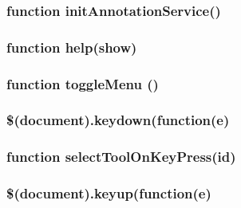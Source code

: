 \subsubsection{function initAnnotationService()}
\subsubsection{function help(show)}
\subsubsection{function toggleMenu ()}
\subsubsection{\$(document).keydown(function(e)}
\subsubsection{function selectToolOnKeyPress(id)}

\subsubsection{\$(document).keyup(function(e)}
